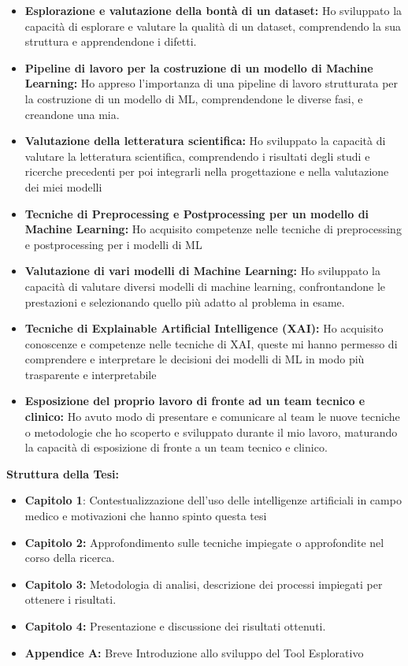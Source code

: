 \begin{flushleft}
\begin{flushleft}
\begin{itemize}
\item \textbf{Esplorazione e valutazione della bontà di un dataset:}
Ho sviluppato la capacità di esplorare e valutare la qualità di un dataset, comprendendo la sua struttura e apprendendone i difetti.
\item \textbf{Pipeline di lavoro per la costruzione di un modello di Machine Learning:}
Ho appreso l'importanza di una pipeline di lavoro strutturata per la costruzione di un modello di ML, comprendendone le diverse fasi, e creandone una mia.
\item \textbf{Valutazione della letteratura scientifica:}
Ho sviluppato la capacità di valutare la letteratura scientifica, comprendendo i risultati degli studi e ricerche precedenti per poi integrarli nella progettazione e nella valutazione dei miei modelli 
\item \textbf{Tecniche di Preprocessing e Postprocessing per un modello di Machine Learning:}
Ho acquisito competenze nelle tecniche di preprocessing e postprocessing per i modelli di ML
\item \textbf{Valutazione di vari modelli di Machine Learning:}
Ho sviluppato la capacità di valutare diversi modelli di machine learning, confrontandone le prestazioni e selezionando quello più adatto al problema in esame.
\item \textbf{Tecniche di Explainable Artificial Intelligence (XAI):}
Ho acquisito conoscenze e competenze nelle tecniche di XAI, queste mi hanno permesso di comprendere e interpretare le decisioni dei modelli di ML in modo  più trasparente e interpretabile
\item \textbf{ Esposizione del proprio lavoro di fronte ad un team tecnico e clinico:}
Ho avuto modo di presentare e comunicare al team le nuove tecniche o metodologie che ho scoperto e sviluppato durante il mio lavoro, maturando la capacità di esposizione di fronte a un team tecnico e clinico.
\end{itemize}

\textbf{Struttura della Tesi:}\newline
\begin{itemize}
    \item \textbf{ Capitolo 1}: Contestualizzazione dell'uso delle intelligenze artificiali in campo medico e motivazioni che hanno spinto questa tesi
    \item \textbf{ Capitolo 2:} 
    Approfondimento sulle tecniche impiegate o approfondite nel corso della ricerca.
    \item \textbf{Capitolo 3:} 
    Metodologia di analisi, descrizione dei processi impiegati per ottenere i risultati.
    \item \textbf{Capitolo 4:} 
    Presentazione e discussione dei risultati ottenuti.
    \item \textbf{Appendice A:} Breve Introduzione allo sviluppo del Tool Esplorativo
\end{itemize}

\end{flushleft}

\end{flushleft}

